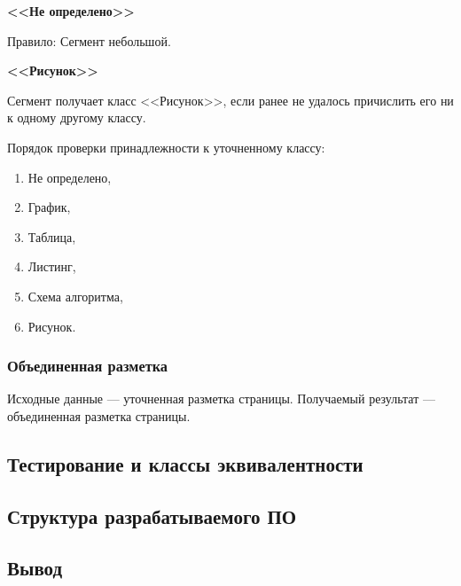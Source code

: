 
\textbf{<<Не определено>>}

Правило: Сегмент небольшой.

\textbf{<<Рисунок>>}

Сегмент получает класс <<Рисунок>>, если ранее не удалось причислить его ни к одному другому классу.

Порядок проверки принадлежности к уточненному классу:
\begin{enumerate}
    \item Не определено,
    \item График,
    \item Таблица,
    \item Листинг,
    \item Схема алгоритма,
    \item Рисунок.
\end{enumerate}

\subsubsection{Объединенная разметка}

Исходные данные --- уточненная разметка страницы.
Получаемый результат --- объединенная разметка страницы.




\subsection{Тестирование и классы эквивалентности}

\subsection{Структура разрабатываемого ПО}

\subsection*{Вывод}

